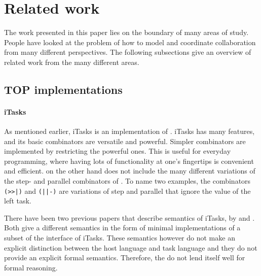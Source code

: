 


\section{Related work}
\label{sec:relatedwork}

The work presented in this paper lies on the boundary of many areas of study.
People have looked at the problem of how to model and coordinate collaboration from many different perspectives.
The following subsections give an overview of related work from the many different areas.


\subsection{TOP implementations}

\paragraph{iTasks}
As mentioned earlier, iTasks is an implementation of \TOP.
iTasks has many features, and its basic combinators are versatile and powerful.
Simpler combinators are implemented by restricting the powerful ones.
This is useful for everyday programming, where having lots of functionality at one's fingertips is convenient and efficient.
\TOPHAT on the other hand does not include the many different variations of the step- and parallel combinators of \ITASKS.
To name two examples, the combinators \verb+(>>|)+ and \verb+(||-)+ are variations of step and parallel that ignore the value of the left task.

There have been two previous papers that describe semantics of iTasks, by \citet{conf/ifl/KoopmanPA08} and \citet{conf/ppdp/PlasmeijerLMAK12}.
Both give a different semantics in the form of minimal implementations of a subset of the interface of iTasks.
These semantics however do not make an explicit distinction between the host language and task language and they do not provide an explicit formal semantics.
Therefore, the do not lend itself well for formal reasoning.




